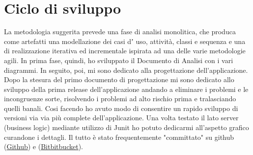 \chapter{Ciclo di sviluppo}

La metodologia suggerita prevede una fase di analisi monolitica, che produca come artefatti una modellazione dei casi dʼ uso, attività, classi e sequenza e una di realizzazione iterativa ed incrementale ispirata ad una delle varie metodologie agili. In prima fase, quindi, ho sviluppato il Documento di Analisi con i vari diagrammi. In seguito, poi, mi sono dedicato alla progettazione dell'applicazione. Dopo la stesura del primo documento di progettazione mi sono dedicato allo sviluppo della prima release dell'applicazione andando a eliminare i problemi e le incongruenze sorte, risolvendo i problemi ad alto rischio prima e tralasciando quelli banali. Cosi facendo ho avuto modo di consentire un rapido sviluppo di versioni via via più complete dell'applicazione. Una volta testato il lato server (business logic) mediante utilizzo di Junit ho potuto dedicarmi all'aspetto grafico curandone i dettagli. Il tutto è stato frequentemente "committato" su github (\href{https://github.com/jgemmy/Doodle}{Github}) e (\href{https://bitbucket.org/jgemmy/doodle}{Bitbitbucket}).
